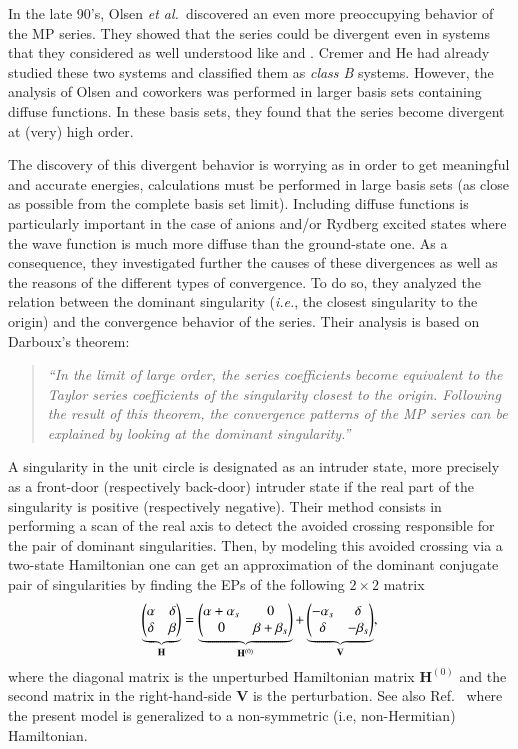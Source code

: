 \documentclass[aps,prb,reprint,noshowkeys,superscriptaddress]{revtex4-1}
\newcommand{\ie}{\textit{i.e.}}
\newcommand{\bH}{\mathbf{H}}
\newcommand{\bV}{\mathbf{V}}
\begin{document}
In the late 90's, Olsen \textit{et al.}~discovered an even more preoccupying behavior of the MP series. \cite{Olsen_1996} They showed that the series could be divergent even in systems that they considered as well understood like  and . \cite{Olsen_1996, Christiansen_1996} Cremer and He had already studied these two systems and classified them as \textit{class B} systems. However, the analysis of Olsen and coworkers was performed in larger basis sets containing diffuse functions. In these basis sets, they found that the series become divergent at (very) high order.

The discovery of this divergent behavior is worrying as in order to get meaningful and accurate energies, calculations must be performed in large basis sets (as close as possible from the complete basis set limit). Including diffuse functions is particularly important in the case of anions and/or Rydberg excited states where the wave function is much more diffuse than the ground-state one. As a consequence, they investigated further the causes of these divergences as well as the reasons of the different types of convergence. To do so, they analyzed the relation between the dominant singularity (\ie, the closest singularity to the origin) and the convergence behavior of the series. \cite{Olsen_2000} Their analysis is based on Darboux's theorem: 
\begin{quote}
	\textit{``In the limit of large order, the series coefficients become equivalent to the Taylor series coefficients of the singularity closest to the origin. Following the result of this theorem, the convergence patterns of the MP series can be explained by looking at the dominant singularity.''}
\end{quote}

A singularity in the unit circle is designated as an intruder state, more precisely as a front-door (respectively back-door) intruder state if the real part of the singularity is positive (respectively negative). Their method consists in performing a scan of the real axis to detect the avoided crossing responsible for the pair of dominant singularities. Then, by modeling this avoided crossing via a two-state Hamiltonian one can get an approximation of the dominant conjugate pair of singularities by finding the EPs of the following $2\times2$ matrix
\begin{equation}
\underbrace{\mqty(\alpha & \delta \\ \delta & \beta)}_{\bH} = \underbrace{\mqty(\alpha + \alpha_s & 0 \\ 0 & \beta + \beta_s )}_{\bH^{(0)}} + \underbrace{\mqty(- \alpha_s & \delta \\ \delta & - \beta_s)}_{\bV},
\end{equation}
where the diagonal matrix is the unperturbed Hamiltonian matrix $\bH^{(0)}$ and the second matrix in the right-hand-side $\bV$ is the perturbation.
See also Ref.~ where the present model is generalized to a non-symmetric (i.e, non-Hermitian) Hamiltonian.
\end{document}
